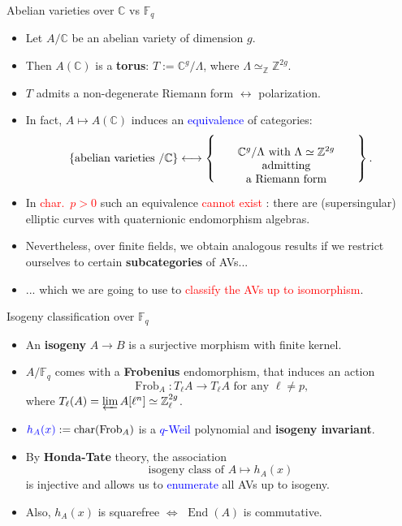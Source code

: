 \documentclass[usenames,dvipsnames]{beamer}
\def\Z{\mathbb{Z}}
\def\C{\mathbb{C}}
\def\F{\mathbb{F}}
\DeclareMathOperator{\Char}{char}
\DeclareMathOperator{\Frob}{Frob}
\DeclareMathOperator{\End}{End}
\newcommand{\set}[1]{\left\lbrace#1\right\rbrace }
\newcommand{\red}[1]{\textcolor{red}{#1}}
\newcommand{\blue}[1]{\textcolor{blue}{#1}}
\begin{document}
\begin{frame}{ Abelian varieties over $\C$ vs $\F_q$ }    
    \begin{itemize}
     \item Let $A/\C$ be an abelian variety of dimension $g$. 
\pause
    \item Then $A(\C)$ is a {\bf torus}: $T:=\C^g/\Lambda$, where $\Lambda\simeq_\Z\Z^{2g}$.
\pause 
    \item $T$ admits a non-degenerate Riemann form $\longleftrightarrow$ polarization.
\pause
    \item In fact, $ A \mapsto A(\C)$ induces an \blue{equivalence} of categories:
    \vspace{-.2cm}
	  \[
      \set{ \text{abelian varieties $/\C$} } \longleftrightarrow 
      \set{\parbox[c]{12.5em}{\center $\C^g/\Lambda$ with $\Lambda\simeq \Z^{2g}$ admitting\\ a Riemann form}}.
     \]
\pause
    \vspace{-.5cm}
    \item In \red{char.~$p>0$} such an equivalence \red{cannot exist} : there are (supersingular) elliptic curves with quaternionic endomorphism algebras.
\pause 
    \item Nevertheless, over finite fields, we obtain analogous results if we restrict ourselves to certain {\bf subcategories} of AVs...
\pause
    \item ... which we are going to use to \red{classify the AVs up to isomorphism}.
	\end{itemize}
\end{frame}

\begin{frame}{ Isogeny classification over $\F_q$}
	\begin{itemize}
    \item An {\bf isogeny} $A\to B$ is a surjective morphism with finite kernel.
\pause     
    \item $A/\F_{q}$ comes with a {\bf Frobenius} endomorphism, 
\pause
    that induces an action
		\[ \Frob_A : T_\ell A \rightarrow T_\ell A \text{ for any }\ell\neq p, \]
		where $T_\ell(A) = \varprojlim A[\ell^n] \simeq \Z_\ell^{2g}$.
\pause
    \item $\blue{h_A(x)}:=\Char(\Frob_A)$ is a \blue{$q$-Weil} polynomial and {\bf isogeny invariant}.
\pause
    \item By {\bf Honda-Tate} theory, the association
		\[ \text{isogeny class of }A \longmapsto h_A(x) \]
		is injective and allows us to \blue{enumerate} all AVs up to isogeny.
\pause
    \item Also, $h_A(x)$ is squarefree $\iff$ $\End(A)$ is commutative.
	\end{itemize}
\end{frame}
\end{document}
